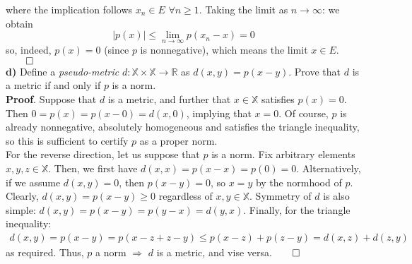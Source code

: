 \documentclass[10pt]{article}
\newcommand{\mbb}[1]{\mathbb{#1}}
\newcommand{\1}[1]{\mathbbm{1}_{#1}}
\begin{document}
    where the implication follows $x_n\in E$ $\forall n\geq 1$. Taking the limit
    as $n\rightarrow\infty$: we obtain
    \[|p(x)|\leq\lim_{n\rightarrow\infty}p(x_n-x)=0\] so, indeed, $p(x)=0$
    (since $p$ is nonnegative), which means the limit $x\in
    E$.\hfill{$\qed$}\\[5pt]
    {\bf d)} Define a {\it pseudo-metric} $d:\mbb{X}\times\mbb{X}\rightarrow
    \mbb{R}$ as $d(x,y)=p(x-y)$. Prove that $d$ is a metric if and only if $p$
    is a norm.\\[5pt]
    {\bf Proof}. Suppose that $d$ is a metric, and further that $x\in\mbb{X}$
    satisfies $p(x)=0$. Then $0=p(x)=p(x-0)=d(x,0)$, implying that $x=0$. Of
    course, $p$ is already nonnegative, absolutely homogeneous and satisfies the
    triangle inequality, so this is sufficient to certify $p$ as a proper
    norm.\\[5pt]
    For the reverse direction, let us suppose that $p$ is a norm. Fix arbitrary
    elements $x,y,z\in\mbb{X}$. Then, we first have $d(x,x)=p(x-x)=p(0)=0$.
    Alternatively, if we assume $d(x,y)=0$, then $p(x-y)=0$, so $x=y$ by the
    normhood of $p$. Clearly, $d(x,y)=p(x-y)\geq 0$ regardless of
    $x,y\in\mbb{X}$. Symmetry of $d$ is also simple:
    $d(x,y)=p(x-y)=p(y-x)=d(y,x)$. Finally, for the triangle inequality:
    \begin{align*}
        d(x,y)=p(x-y)=p(x-z+z-y)\leq p(x-z)+p(z-y)=d(x,z)+d(z,y)
    \end{align*}
    as required. Thus, $p$ a norm $\Rightarrow$ $d$ is a metric, and vise
    versa.\hfill{$\qed$}
\end{document}
